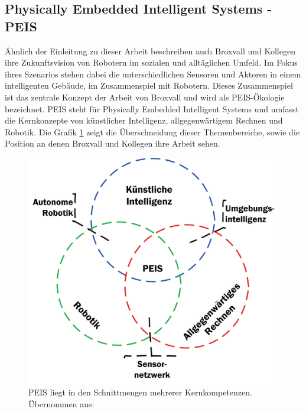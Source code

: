 \subsection{Physically Embedded Intelligent Systems - PEIS}
\label{sec:relatedwork-peis}

Ähnlich der Einleitung zu dieser Arbeit beschreiben auch Broxvall und Kollegen ihre Zukunftsvision von Robotern im sozialen und alltäglichen Umfeld. Im Fokus ihres Szenarios stehen dabei die unterschiedlichen Sensoren und Aktoren in einem intelligenten Gebäude, im Zusammenspiel mit Robotern. Dieses Zusammenspiel ist das zentrale Konzept der Arbeit von Broxvall und wird als PEIS-Ökologie bezeichnet. PEIS steht für Physically Embedded Intelligent Systems und umfasst die Kernkonzepte von künstlicher Intelligenz, allgegenwärtigem Rechnen und Robotik. Die Grafik \ref{fig:sota-peis} zeigt die Überschneidung dieser Themenbereiche, sowie die Position an denen Broxvall und Kollegen ihre Arbeit sehen.\cite{Saffiotti:2005:PEA:1107548.1107615}


\begin{figure}[H]
	\centering
	\includegraphics[scale=0.6]{fig/peis}   
	\caption[Kompetenzen PEIS]{PEIS liegt in den Schnittmengen mehrerer Kernkompetenzen. Übernommen aus: \cite{Saffiotti:2005:PEA:1107548.1107615}}
	\label{fig:sota-peis}
\end{figure}


